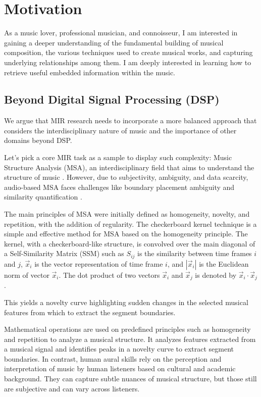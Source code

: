 \section{Motivation}
As a music lover, professional musician, and connoisseur, I am interested in gaining a deeper understanding of the fundamental building of musical composition, the various techniques used to create musical works, and capturing underlying relationships among them. I am deeply interested in learning how to retrieve useful embedded information within the music. 

\subsection{Beyond Digital Signal Processing (DSP)}

We argue that MIR research needs to incorporate a more balanced approach that considers the interdisciplinary nature of music and the importance of other domains beyond DSP.

Let's pick a core MIR task as a sample to display such complexity: Music Structure Analysis (MSA), an interdisciplinary field that aims to understand the structure of music \cite{Nieto2020Audio-BasedApplications}. However, due to subjectivity, ambiguity, and data scarcity, audio-based MSA faces challenges like boundary placement ambiguity and similarity quantification \cite{NietoPerceptualMusic}. 

The main principles of MSA were initially defined as homogeneity, novelty, and repetition, with the addition of regularity. The checkerboard kernel technique is a simple and effective method for MSA based on the homogeneity principle. The kernel, with a checkerboard-like structure, is convolved over the main diagonal of a Self-Similarity Matrix (SSM) such as $S_{ij}$ is the similarity between time frames $i$ and $j$, $\vec{x}_i$ is the vector representation of time frame $i$, and $\left| \vec{x}_i \right|$ is the Euclidean norm of vector $\vec{x}_i$. The dot product of two vectors $\vec{x}_i$ and $\vec{x}_j$ is denoted by $\vec{x}_i \cdot \vec{x}_j$.



This yields a novelty curve highlighting sudden changes in the selected musical features from which to extract the segment boundaries.



Mathematical operations are used on predefined principles such as homogeneity and repetition to analyze a musical structure. It analyzes features extracted from a musical signal and identifies peaks in a novelty curve to extract segment boundaries. In contrast, human aural skills rely on the perception and interpretation of music by human listeners based on cultural and academic background. They can capture subtle nuances of musical structure, but those still are subjective and can vary across listeners.

